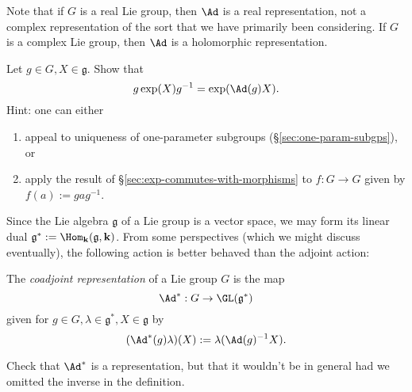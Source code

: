\documentclass[reqno]{amsart} 
\begin{document}
\begin{definition}
  Note that if $G$ is a real Lie
  group, then $\Ad$ is a real representation, not a complex
  representation of the sort that we have primarily been
  considering.  If $G$ is a complex Lie group, then $\Ad$ is a
  holomorphic representation.
\end{definition}

\begin{exercise}\label{exercise:conjugation-and-Ad-are-intertwined-by-exponential}
  Let $g \in G, X \in \mathfrak{g}$.
  Show that
  \begin{equation*}
    g \exp(X) g^{-1}
    =
    \exp(\Ad(g) X).
  \end{equation*}
  Hint: one can either
  \begin{enumerate}
  \item appeal to uniqueness of one-parameter subgroups
    (\S\ref{sec:one-param-subgps}), or
  \item apply the result of
    \S\ref{sec:exp-commutes-with-morphisms}
    to $f : G \rightarrow G$ given by
    $f(a) := g a g^{-1}$.
  \end{enumerate}
\end{exercise}

Since the Lie algebra $\mathfrak{g}$  of a Lie group is a vector
space,
we may form its linear dual $\mathfrak{g}^* :=
\Hom_{\mathbf{k}}(\mathfrak{g},\mathbf{k})$.
From some perspectives (which
we might discuss eventually),
the following action is better behaved than the adjoint action:
\begin{definition}
  The \emph{coadjoint representation} of a Lie group $G$
  is the map
  \begin{equation*}
    \Ad^* : G \rightarrow \GL(\mathfrak{g}^*)
  \end{equation*}
  given for $g \in G, \lambda \in \mathfrak{g}^*, X \in
  \mathfrak{g}$
  by
  \begin{equation*}
    (\Ad^*(g) \lambda)(X) := \lambda(\Ad(g)^{-1} X).
  \end{equation*}
\end{definition}
\begin{exercise}
  Check that $\Ad^*$ is a representation,
  but that it wouldn't be in general
  had we omitted the inverse in the definition.
\end{exercise}
\end{document}
